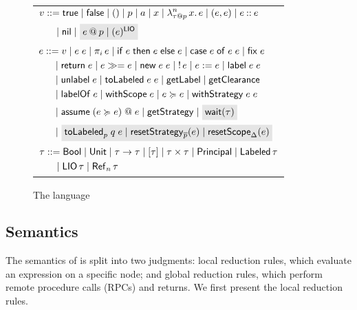 \begin{figure}
    \centering
    \begin{tabular}{l}
         $\begin{aligned}[t]
         \val &::= \true \mid \false \mid () \mid p \mid \addr \mid x \mid \abs{n}{\lb{p}{\type}}{x}{\expr} \mid (\expr, \expr) \mid \cons{\expr}{\expr} \\
         &\quad \mid \nil \mid \graybox{\lb{p}{\expr} \mid \lio{\expr}}
         \end{aligned}$ \\
         $\begin{aligned}[t]
         \expr &::= \val \mid \app{\expr}{\expr} \mid \proj{i}{\expr} \mid \ifexpr{\expr}{\expr}{\expr} \mid \case{\expr}{\expr}{\expr} \mid \fix{\expr} \\ &\quad \mid \return{\expr} \mid \bind{\expr}{\expr} \mid
         \new{\expr}{\expr} \mid \readref{\expr} \mid \writeref{\expr}{\expr} \mid \Label{\expr}{\expr} \\ &\quad
         \mid \unlabel{\expr} \mid
         \tolabeled{\expr}{\expr} \mid \getlabel \mid \getclearance \\ &\quad
         \mid \labelof{\expr} \mid \withscope{\expr} \mid \expr \actsfor \expr \mid \withstrategy{\expr}{\expr} \\ &\quad \mid \adddelegate{\expr}{\expr}{\expr} \mid \getstrategy
         \mid \graybox{\wait[\type]} \\ &\quad
         \mid \graybox{\internalTolabeled{p}{q}{\expr} \mid \resetstrategy{\overline{p}}{\expr} \mid \resetscope{\scope}{\expr}}
         \end{aligned}$ \\
         $\begin{aligned}[t]
         \type &::= \bool \mid \unit \mid \func{\type}{\type} \mid \listtype{\type} \mid \pair{\type}{\type} \mid \labeltype \mid \labeled{\type} \\ &\quad
         \mid \liotype{\type} \mid \reftype[n]{\type}
         \end{aligned}$
    \end{tabular}
    \caption{The \lang{} language}
    \label{fig:language-syntax}
\end{figure}

\subsection{Semantics}\label{sec:semantics}
The semantics of \lang{} is split into two judgments: local reduction rules, which evaluate an expression on a specific node; and global reduction rules, which perform remote procedure calls (RPCs) and returns. We first present the local reduction rules.


